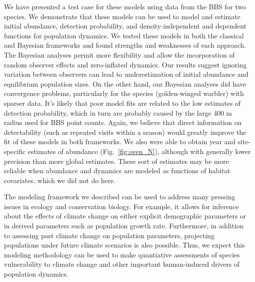 \documentclass[12pt]{article}
\begin{document}
We have presented a test case for these models using data from
the BBS for two species. We demonstrate that these models can be
used to model and estimate initial abundance, detection
probability, and density-independent and dependent functions for
population dynamics. We tested these models in both the
classical and Bayesian frameworks and found strengths and
weaknesses of each approach. The Bayesian analyses permit more
flexibility and allow the incorporation of random observer
effects and zero-inflated dynamics. Our results suggest ignoring
variation between observers can lead to underestimation of
initial abundance and equilibrium population sizes. On the other
hand, our Bayesian analyses did have convergence problems,
particularly for the species (golden-winged warbler) with sparser data. It's
likely that poor model fits are related to the low estimates of
detection probability, which in turn are probably caused by the
large 400 m radius used for BBS point counts. Again, we believe
that direct information on detectability (such as repeated
visits within a season) would greatly improve the fit of these
models in both frameworks.  We also were able to obtain year
and site-specific estimates of abundance (Fig.~\ref{fig:oven_N}),
although with generally lower precision than more global estimates.  These sort of estimates
may be more reliable when abundance and dynamics are modeled 
as functions of habitat covariates, which we did not do here.

The modeling framework we described can be used to address many
pressing issues in ecology and conservation biology. For
example,
it allows for inference %
about the effects of climate change on either explicit
demographic parameters or in derived parameters such as
population growth rate. Furthermore, %
in addition to assessing past climate change on population
parameters, projecting populations under future climate scenarios is also
possible. Thus, we expect this modeling methodology can be used
to make quantiative assessments of species vulnerability to climate
change and other important human-induced drivers of population
dynamics.
\end{document}
